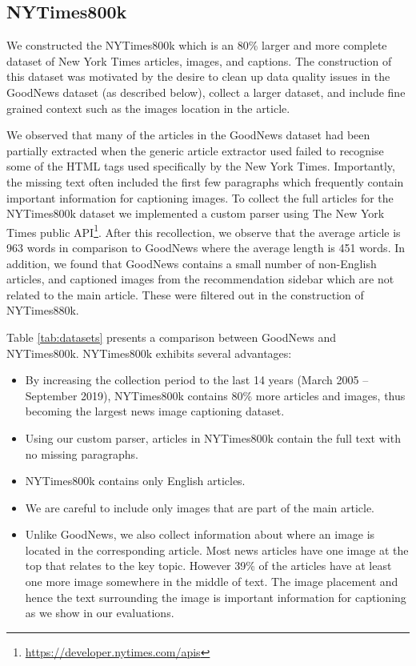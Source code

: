 \subsection{NYTimes800k}
\label{ssec:nytimes800k}

We constructed the NYTimes800k which is an 80\% larger and more complete
dataset
of New York Times articles, images, and captions. The construction of this
dataset was motivated by the desire to clean up data quality issues in the
GoodNews dataset (as described below), collect a larger dataset, and include
fine grained context
such as the images location in the article.

We observed that many of the articles in the GoodNews dataset had
been partially extracted when the generic article extractor used
failed to recognise some of the HTML tags used
specifically by the New York Times. Importantly, the missing text often
included the first few
paragraphs
which frequently contain important information for captioning images. To
collect the full articles for the NYTimes800k dataset we
implemented a custom parser using The New York Times public
API\footnote{\href{https://developer.nytimes.com/apis}{https://developer.nytimes.com/apis}}.
After this recollection, we observe that the average article is 963 words in
comparison to GoodNews where the average length is 451 words. In addition, we
found that GoodNews contains a
small number of non-English articles, and captioned images from the
recommendation sidebar which are not related to the main article. These were
filtered out in the construction of NYTimes880k.


Table \ref{tab:datasets} presents a comparison between GoodNews and
NYTimes800k. NYTimes800k exhibits several advantages:

\begin{itemize}
   \item By increasing the collection period to the last 14 years (March 2005
   -- September 2019), NYTimes800k contains 80\% more articles and images, thus
   becoming the largest news image captioning dataset.
   \item Using our custom parser, articles in NYTimes800k contain the full text
   with no missing paragraphs.
   \item NYTimes800k contains only English articles.
   \item We are careful to include only images that are part of the main
   article.
   \item Unlike GoodNews, we also collect information about where an image is
   located in the corresponding article. Most news articles have one image at
   the top that relates to the key topic. However 39\% of the articles have at
   least one more image somewhere in the middle of text. The image placement
   and hence the text surrounding the image is important information for
   captioning as we show in our evaluations.
\end{itemize}

